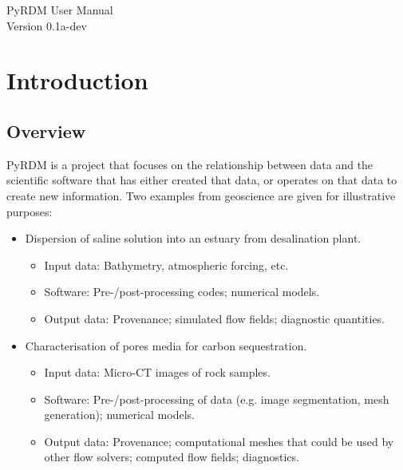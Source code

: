\documentclass[a4paper,11pt]{report}
\begin{document}
\begin{titlepage}
\begin{center}
\vspace*{3cm}
\huge{PyRDM User Manual}\\\vspace*{2cm}
\LARGE{Version 0.1a-dev}
\end{center}
\end{titlepage}

\tableofcontents

\chapter{Introduction}\label{chap:introduction}
\section{Overview}
PyRDM is a project that focuses on the relationship between data and the scientific software that has either created that data, or operates on that data to create new information. Two examples from geoscience are given for illustrative purposes:
\begin{itemize}
  \item Dispersion of saline solution into an estuary from desalination plant.
  \begin{itemize}
    \item Input data: Bathymetry, atmospheric forcing, etc.
    \item Software: Pre-/post-processing codes; numerical models.
    \item Output data: Provenance; simulated flow fields; diagnostic quantities.
  \end{itemize}
  \item Characterisation of pores media for carbon sequestration.
  \begin{itemize}
    \item Input data: Micro-CT images of rock samples.
    \item Software: Pre-/post-processing of data (e.g. image segmentation, mesh generation); numerical models.
    \item Output data: Provenance; computational meshes that could be used by other flow solvers; computed flow fields; diagnostics.
  \end{itemize}
\end{itemize}
\end{document}
